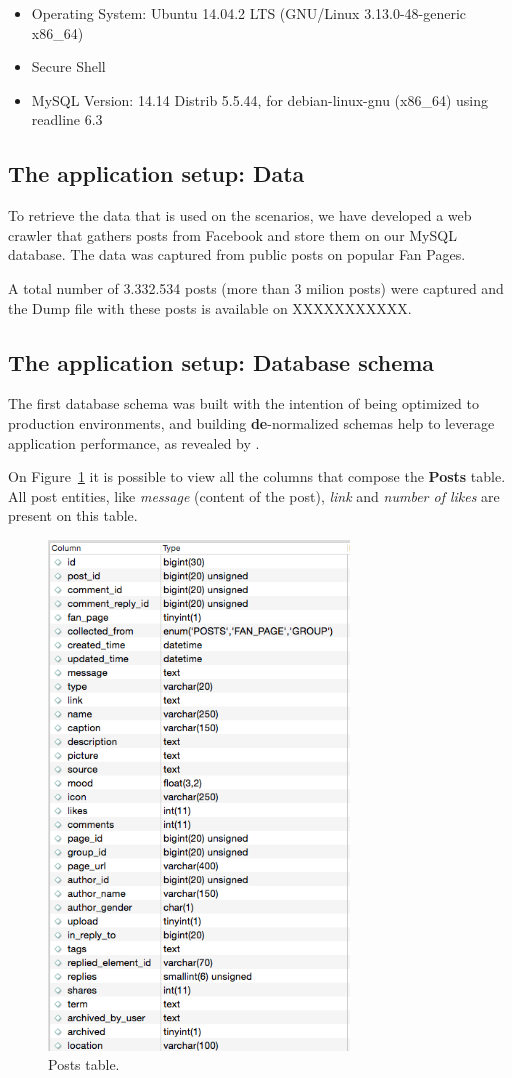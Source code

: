 \begin{itemize}
\item{Operating System: Ubuntu 14.04.2 LTS (GNU/Linux 3.13.0-48-generic x86\_64)}
\item{Secure Shell}
\item{MySQL Version: 14.14 Distrib 5.5.44, for debian-linux-gnu (x86\_64) using readline 6.3}
\end{itemize}

\subsection{The application setup: Data}
To retrieve the data that is used on the scenarios, we have developed a web crawler that gathers posts from Facebook and store them on our MySQL database. The data was captured from public posts on popular Fan Pages.

A total number of 3.332.534 posts (more than 3 milion posts) were captured and the Dump file with these posts is available on XXXXXXXXXXX. 

\subsection{The application setup: Database schema}
\label{database_schema_section}
The first database schema was built with the intention of being optimized to production environments, and building \textbf{de}-normalized schemas help to leverage application performance, as revealed by \cite{926306}. 

On Figure~\ref{fig:postsTable} it is possible to view all the columns that compose the \textbf{Posts} table. All post entities, like \textit{message} (content of the post), \textit{link} and \textit{number of likes} are present on this table. 

\begin{figure}[ht!]
\centering
\includegraphics[width=80mm]{postTable.png}
\caption{Posts table.\label{fig:postsTable}}
\end{figure}

